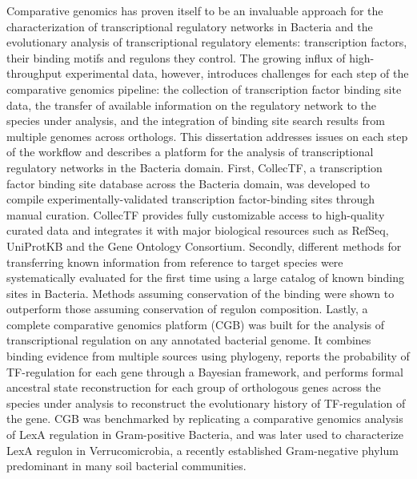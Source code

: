 Comparative genomics has proven itself to be an invaluable approach for the
characterization of transcriptional regulatory networks in Bacteria and the
evolutionary analysis of transcriptional regulatory elements: transcription
factors, their binding motifs and regulons they control. The growing influx of
high-throughput experimental data, however, introduces challenges for each step
of the comparative genomics pipeline: the collection of transcription factor
binding site data, the transfer of available information on the regulatory
network to the species under analysis, and the integration of binding site
search results from multiple genomes across orthologs. This dissertation
addresses issues on each step of the workflow and describes a platform for the
analysis of transcriptional regulatory networks in the Bacteria domain. First,
CollecTF, a transcription factor binding site database across the Bacteria
domain, was developed to compile experimentally-validated transcription
factor-binding sites through manual curation. CollecTF provides fully
customizable access to high-quality curated data and integrates it with major
biological resources such as RefSeq, UniProtKB and the Gene Ontology
Consortium. Secondly, different methods for transferring known information from
reference to target species were systematically evaluated for the first time
using a large catalog of known binding sites in Bacteria.  Methods assuming
conservation of the binding were shown to outperform those assuming
conservation of regulon composition. Lastly, a complete comparative genomics
platform (CGB) was built for the analysis of transcriptional regulation on any
annotated bacterial genome. It combines binding evidence from multiple sources
using phylogeny, reports the probability of TF-regulation for each gene through
a Bayesian framework, and performs formal ancestral state reconstruction for
each group of orthologous genes across the species under analysis to
reconstruct the evolutionary history of TF-regulation of the gene. CGB was
benchmarked by replicating a comparative genomics analysis of LexA regulation
in Gram-positive Bacteria, and was later used to characterize LexA regulon in
Verrucomicrobia, a recently established Gram-negative phylum predominant in
many soil bacterial communities.



\par\vfil
